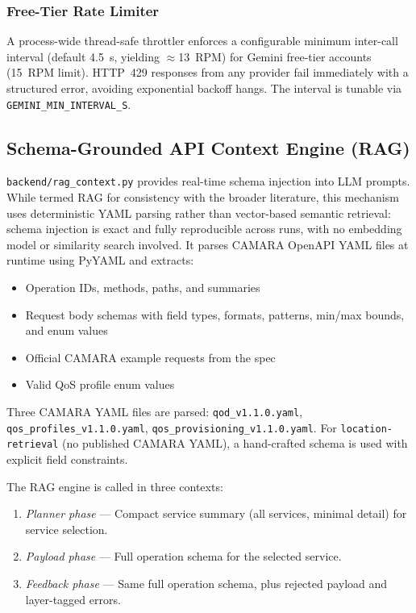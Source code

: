 \documentclass[conference]{IEEEtran}
\begin{document}
\subsubsection{Free-Tier Rate Limiter}
A process-wide thread-safe throttler enforces a configurable minimum
inter-call interval (default 4.5~s, yielding $\approx$13~RPM) for
Gemini free-tier accounts (15~RPM limit). HTTP~429 responses from any
provider fail immediately with a structured error, avoiding exponential
backoff hangs. The interval is tunable via \texttt{GEMINI\_MIN\_INTERVAL\_S}.

\subsection{Schema-Grounded API Context Engine (RAG)}

\texttt{backend/rag\_context.py} provides real-time schema injection into
LLM prompts. While termed RAG for consistency with the broader literature,
this mechanism uses deterministic YAML parsing rather than vector-based
semantic retrieval: schema injection is exact and fully reproducible across
runs, with no embedding model or similarity search involved. It parses CAMARA OpenAPI YAML files at runtime using PyYAML
and extracts:

\begin{itemize}[leftmargin=1.2em]
  \item Operation IDs, methods, paths, and summaries
  \item Request body schemas with field types, formats, patterns,
        min/max bounds, and enum values
  \item Official CAMARA example requests from the spec
  \item Valid QoS profile enum values
\end{itemize}

Three CAMARA YAML files are parsed: \texttt{qod\_v1.1.0.yaml},
\texttt{qos\_profiles\_v1.1.0.yaml}, \texttt{qos\_provisioning\_v1.1.0.yaml}.
For \texttt{location-retrieval} (no published CAMARA YAML), a hand-crafted
schema is used with explicit field constraints.

The RAG engine is called in three contexts:
\begin{enumerate}[leftmargin=1.5em]
  \item \emph{Planner phase} — Compact service summary (all services, minimal
        detail) for service selection.
  \item \emph{Payload phase} — Full operation schema for the selected service.
  \item \emph{Feedback phase} — Same full operation schema, plus rejected
        payload and layer-tagged errors.
\end{enumerate}
\end{document}
